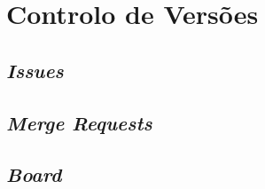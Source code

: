 \chapter{Controlo de Versões}

\section{\textit{Issues}}

\section{\textit{Merge Requests}}

\section{\textit{Board}}

